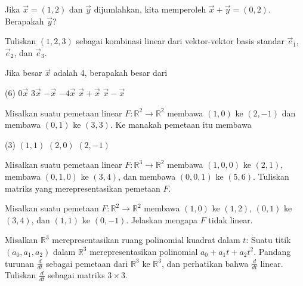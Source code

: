 \begin{exercise}
Jika $\vec{x} = (1,2)$ dan $\vec{y}$ dijumlahkan, kita memperoleh
$\vec{x}+\vec{y} = (0,2)$. Berapakah $\vec{y}$?
\end{exercise}

\begin{exercise}
Tuliskan $(1,2,3)$ sebagai kombinasi linear dari vektor-vektor basis standar
$\vec{e}_1$, $\vec{e}_2$, dan $\vec{e}_3$.
\end{exercise}

\begin{exercise}
Jika besar $\vec{x}$ adalah 4, berapakah besar dari
\begin{tasks}(6)
\task
$0\vec{x}$
\task
$3\vec{x}$
\task
$-\vec{x}$
\task
$-4\vec{x}$
\task
$\vec{x}+\vec{x}$
\task
$\vec{x}-\vec{x}$
\end{tasks}
\end{exercise}

\begin{exercise}
Misalkan suatu pemetaan linear $F \colon {\mathbb R}^2 \to {\mathbb R}^2$
membawa $(1,0)$ ke $(2,-1)$ dan membawa $(0,1)$ ke $(3,3)$.
Ke manakah pemetaan itu membawa
\begin{tasks}(3)
\task
$(1,1)$
\task
$(2,0)$
\task
$(2,-1)$
\end{tasks}
\end{exercise}

\begin{exercise}
Misalkan suatu pemetaan linear $F \colon {\mathbb R}^3 \to {\mathbb R}^2$
membawa $(1,0,0)$ ke $(2,1)$, membawa $(0,1,0)$ ke $(3,4)$, dan
membawa $(0,0,1)$ ke $(5,6)$. Tuliskan matriks yang merepresentasikan
pemetaan $F$.
\end{exercise}

\begin{exercise}
Misalkan suatu pemetaan $F \colon {\mathbb R}^2 \to \mathbb{R}^2$ membawa
$(1,0)$ ke $(1,2)$, $(0,1)$ ke $(3,4)$, dan $(1,1)$ ke $(0,-1)$.
Jelaskan mengapa $F$ tidak linear.
\end{exercise}

\begin{exercise}[menantang]
Misalkan ${\mathbb R}^3$ merepresentasikan ruang polinomial kuadrat
dalam $t$: Suatu titik $(a_0,a_1,a_2)$ dalam ${\mathbb R}^3$ merepresentasikan
polinomial $a_0 + a_1 t + a_2 t^2$.
Pandang turunan $\frac{d}{dt}$ sebagai pemetaan dari ${\mathbb R}^3$ ke
${\mathbb R}^3$,
dan perhatikan bahwa $\frac{d}{dt}$ linear.
Tuliskan $\frac{d}{dt}$ sebagai matriks $3 \times 3$.
\end{exercise}

